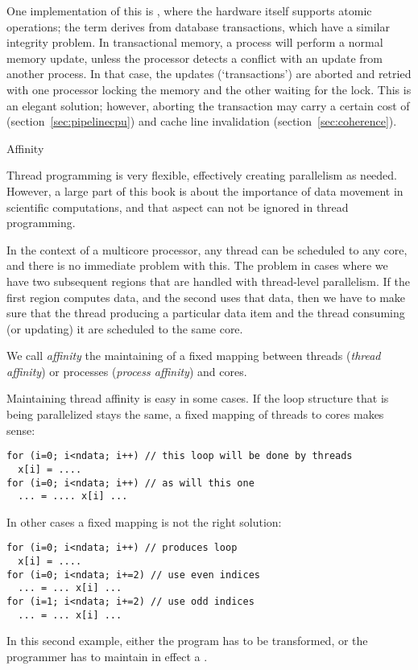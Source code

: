 One implementation of
this is , where the hardware itself
supports atomic operations; the term derives from database
transactions, which have a similar integrity problem. In transactional
memory, a process will perform a normal memory update, unless the
processor detects a conflict with an update from another process. In
that case, the updates (`transactions') are aborted and retried with
one processor locking the memory and the other waiting for the
lock. This is an elegant solution; however, aborting the transaction
may carry a certain cost of 
(section~\ref{sec:pipelinecpu}) and
cache line invalidation (section~\ref{sec:coherence}).


 {Affinity}

Thread programming is very flexible, effectively creating parallelism
as needed. However, a large part of this book is about the importance
of data movement in scientific computations, and that aspect can not
be ignored in thread programming.

In the context of a multicore processor, any thread can be scheduled
to any core, and there is no immediate problem with this. The problem
in cases where we have two subsequent regions that are handled with
thread-level parallelism. If the first region computes data, and the
second uses that data, then we have to make sure that the thread
producing a particular data item and the thread consuming (or
updating) it are scheduled to the same core.

We call \emph{affinity} the maintaining of a fixed mapping between
threads (\emph{thread affinity})
or processes (\emph{process
  affinity}) and cores.

Maintaining thread affinity is easy in some cases. If the loop
structure that is being parallelized stays the same, a fixed mapping
of threads to cores makes sense:
\begin{verbatim}
for (i=0; i<ndata; i++) // this loop will be done by threads
  x[i] = ....
for (i=0; i<ndata; i++) // as will this one
  ... = .... x[i] ...
\end{verbatim}
In other cases a fixed mapping is not the right solution:
\begin{verbatim}
for (i=0; i<ndata; i++) // produces loop
  x[i] = ....
for (i=0; i<ndata; i+=2) // use even indices
  ... = ... x[i] ...
for (i=1; i<ndata; i+=2) // use odd indices
  ... = ... x[i] ...
\end{verbatim}
In this second example, either the program has to be transformed, or
the programmer has to maintain in effect a .

